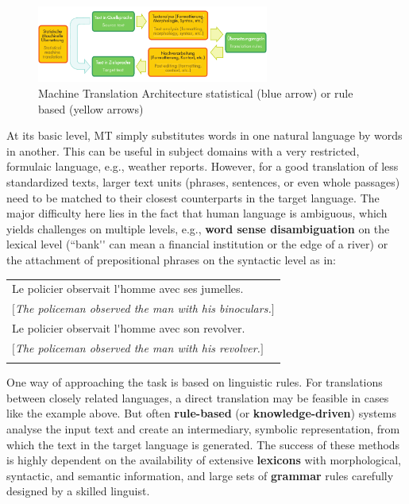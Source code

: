 \begin{multicols}{2}
\begin{figure}
\begin{center}
 \includegraphics[width=3.0in]{../_media/machine_translation}
\caption{Machine Translation Architecture statistical (blue arrow) or rule based (yellow arrows)}
\label{fig:mtarchiEng}
\end{center}
\end{figure}

At its basic level, MT simply substitutes words in one natural
language by words in another. This can be useful in subject domains
with a very restricted, formulaic language, e.g., weather
reports. However, for a good translation of less standardized texts,
larger text units (phrases, sentences, or even whole passages) need to
be matched to their closest counterparts in the target language. The
major difficulty here lies in the fact that human language is
ambiguous, which yields challenges on multiple levels, e.g., {\bf word
sense disambiguation} on the lexical level (``bank{\mbox '}{\mbox '} can mean a financial institution or the edge of a river) or the attachment of prepositional phrases on the syntactic
level as in:
\begin{tabular}{l}
\\
Le policier observait l{\mbox '}homme avec ses jumelles.\\
$[${\it The policeman observed the man with his binoculars.}$]$\\
Le policier observait l{\mbox '}homme avec son revolver.\\
$[${\it The policeman observed the man with his revolver.}$]$\\
\\
\end{tabular}

One way of approaching the task is based on linguistic rules. For
translations between closely related languages, a direct translation
may be feasible in cases like the example above. But often {\bf rule-based}
(or {\bf knowledge-driven}) systems analyse the input text and create an
intermediary, symbolic representation, from which the text in the
target language is generated. The success of these methods is highly
dependent on the availability of extensive {\bf lexicons} with
morphological, syntactic, and semantic information, and large sets of
{\bf grammar} rules carefully designed by a skilled linguist.


\end{multicols}
